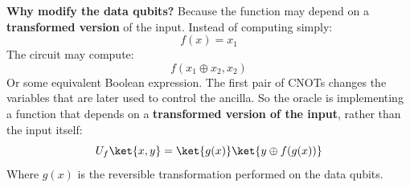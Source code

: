 \highspace
\textcolor{Green3}{ \textbf{Why modify the data qubits?}} Because the function may depend on a \textbf{transformed version} of the input. Instead of computing simply:
\begin{equation*}
    f(x) = x_1
\end{equation*}
The circuit may compute:
\begin{equation*}
    f\left(x_1 \oplus x_2, x_2\right)
\end{equation*}
Or some equivalent Boolean expression. The first pair of CNOTs changes the variables that are later used to control the ancilla. So the oracle is implementing a function that depends on a \textbf{transformed version of the input}, rather than the input itself:
\begin{equation*}
    U_f \ket{x, y} = \ket{g(x)} \ket{y \oplus f(g(x))}
\end{equation*}
Where $g(x)$ is the reversible transformation performed on the data qubits.

